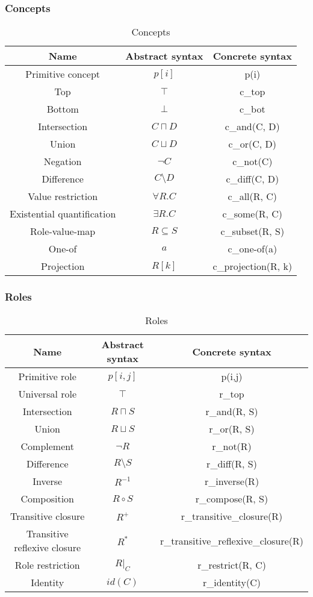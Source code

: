 \documentclass{article}
\begin{document}
\subsubsection{Concepts}

\begin{table}[H]
    \centering
    \begin{tabular}{ccc}
    Name & Abstract syntax & Concrete syntax \\
    \hline
    Primitive concept & $p[i]$ & p(i) \\
    Top & $\top$ & c\_top \\
    Bottom & $\bot$ & c\_bot \\
    Intersection & $C\sqcap D$ & c\_and(C, D) \\
    Union & $C\sqcup D$ & c\_or(C, D) \\
    Negation & $\neg C$ & c\_not(C) \\
    Difference & $C\setminus D$ & c\_diff(C, D) \\
    Value restriction & $\forall R.C$ & c\_all(R, C) \\
    Existential quantification & $\exists R.C$ & c\_some(R, C) \\
    Role-value-map & $R\subseteq S$ & c\_subset(R, S) \\
    One-of & $a$ & c\_one-of(a) \\
    Projection & $R[k]$ & c\_projection(R, k) \\
    \end{tabular}
    \caption{Concepts}
\end{table}

\subsubsection{Roles}

\begin{table}[H]
    \centering
    \begin{tabular}{ccc}
    Name & Abstract syntax & Concrete syntax \\
    \hline
    Primitive role & $p[i,j]$ & p(i,j) \\
    Universal role & $\top$ & r\_top \\
    Intersection & $R\sqcap S$ & r\_and(R, S) \\
    Union & $R\sqcup S$ & r\_or(R, S) \\
    Complement & $\neg R$ & r\_not(R) \\
    Difference & $R\setminus S$ & r\_diff(R, S) \\
    Inverse & $R^{-1}$ & r\_inverse(R) \\
    Composition & $R\circ S$ & r\_compose(R, S) \\
    Transitive closure & $R^+$ & r\_transitive\_closure(R) \\
    Transitive reflexive closure & $R^*$ & r\_transitive\_reflexive\_closure(R) \\
    Role restriction & $R\vert_{C}$ & r\_restrict(R, C) \\
    Identity & $\mathit{id}(C)$ & r\_identity(C) \\
    \end{tabular}
    \caption{Roles}
\end{table}
\end{document}

